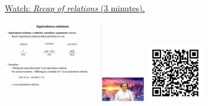 
\begin{minipage}{10cm}
    \href{https://act4e-spring21.netlify.app/videos/spring2021-tradeoffs:relations-properties.html}{Watch: \emph{Recap of relations} (3 minutes).}
        
    \href{https://act4e-spring21.netlify.app/videos/spring2021-tradeoffs:relations-properties.html}{\includegraphics[height=3.5cm]{spring2021-tradeoffs:relations-properties/thumbnails.jpg}}
    \href{https://act4e-spring21.netlify.app/videos/spring2021-tradeoffs:relations-properties.html}{\includegraphics[height=2.5cm]{spring2021-tradeoffs:relations-properties/qrcode.png}}
\end{minipage}
